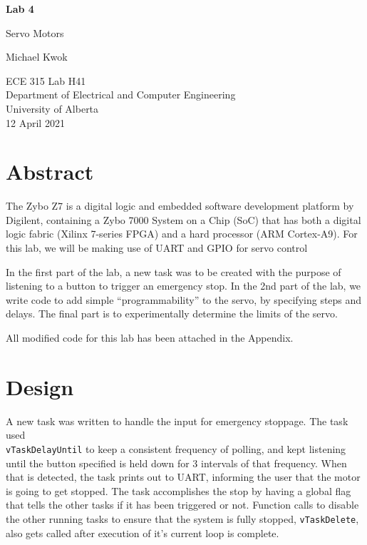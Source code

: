 \documentclass{article}
\begin{document}
\begin{titlepage}
    \begin{center}
        \vspace*{1cm}

        \textbf{\Large{Lab 4}}

        \vspace{0.5cm}

        \LARGE{Servo Motors}
        \vspace{1.5cm}

        Michael Kwok

        \vfill
        \Large{ECE 315 Lab H41\\
            Department of Electrical and Computer Engineering\\
            University of Alberta\\
            12 April 2021}
    \end{center}
\end{titlepage}
\newpage
\section{Abstract}
The Zybo Z7 is a digital logic and embedded software development platform by Digilent, containing a Zybo 7000 System on a Chip (SoC) that has both a digital logic fabric (Xilinx 7-series FPGA) and a hard processor (ARM Cortex-A9). For this lab, we will be making use of UART and GPIO for servo control\@

In the first part of the lab, a new task was to be created with the purpose of listening to a button to trigger an emergency stop. In the 2nd part of the lab, we write code to add simple ``programmability'' to the servo, by specifying steps and delays. The final part is to experimentally determine the limits of the servo.\@

All modified code for this lab has been attached in the Appendix.

\section{Design}
A new task was written to handle the input for emergency stoppage. The task used\\\verb|vTaskDelayUntil| to keep a consistent frequency of polling, and kept listening until the button specified is held down for 3 intervals of that frequency. When that is detected, the task prints out to UART, informing the user that the motor is going to get stopped. The task accomplishes the stop by having a global flag that tells the other tasks if it has been triggered or not. Function calls to disable the other running tasks to ensure that the system is fully stopped, \verb|vTaskDelete|, also gets called after execution of it's current loop is complete.
\end{document}
